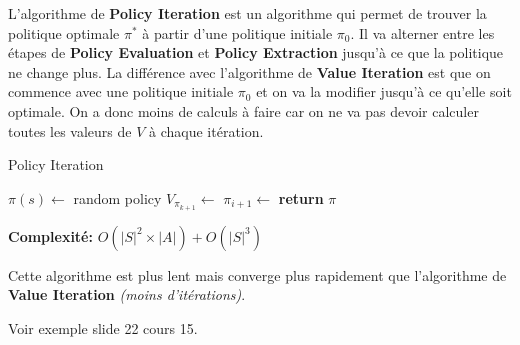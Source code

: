 L'algorithme de \textbf{Policy Iteration} est un algorithme qui permet de trouver la politique optimale $\pi^*$ à partir d'une politique initiale $\pi_0$. 
Il va alterner entre les étapes de \textbf{Policy Evaluation} et \textbf{Policy Extraction} jusqu'à ce que la politique ne change plus. 
La différence avec l'algorithme de \textbf{Value Iteration} est que on commence avec une politique initiale $\pi_0$ et on va la modifier jusqu'à ce qu'elle soit optimale. 
On a donc moins de calculs à faire car on ne va pas devoir calculer toutes les valeurs de $V$ à chaque itération. 

\begin{algorithm}[H]
    \caption{Policy Iteration}\label{alg:policyiteration}
    \begin{algorithmic}[1]
            \State $\pi(s) \gets$ random policy
            \Repeat
            \State $V_{\pi_{k+1}} \gets$ 
            \State $\pi_{i+1} \gets$ 
            \State \textbf{return} $\pi$
        \EndProcedure
    \end{algorithmic} 
\end{algorithm}

\textbf{Complexité:} $O(|S|^2 \times |A|) + O(|S|^3)$

Cette algorithme est plus lent mais converge plus rapidement que l'algorithme de \textbf{Value Iteration} \textit{(moins d'itérations)}.

\begin{remark}\leavevmode
    Voir exemple slide 22 cours 15.
\end{remark}













